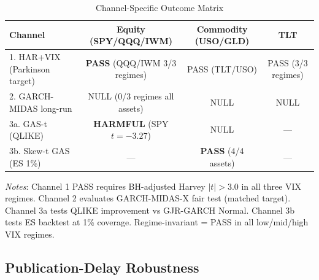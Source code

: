 \documentclass[12pt,a4paper]{article}
\begin{document}
\begin{table}[H]
\centering
\small
\begin{threeparttable}
\caption{Channel-Specific Outcome Matrix}
\label{tab:channel_outcomes}
\begin{tabular}{@{}lccc@{}}
\toprule
Channel & Equity (SPY/QQQ/IWM) & Commodity (USO/GLD) & TLT \\
\midrule
1. HAR+VIX (Parkinson target) & \textbf{PASS} (QQQ/IWM 3/3 regimes) & PASS (TLT/USO) & PASS (3/3 regimes) \\
2. GARCH-MIDAS long-run & NULL (0/3 regimes all assets) & NULL & NULL \\
3a. GAS-t (QLIKE) & \textbf{HARMFUL} (SPY $t=-3.27$) & NULL & --- \\
3b. Skew-t GAS (ES 1\%) & --- & \textbf{PASS} (4/4 assets) & --- \\
\bottomrule
\end{tabular}
\begin{tablenotes}
\small
\item \textit{Notes}: Channel 1 PASS requires BH-adjusted Harvey $|t|>3.0$ in all three VIX regimes. Channel 2 evaluates GARCH-MIDAS-X fair test (matched target). Channel 3a tests QLIKE improvement vs GJR-GARCH Normal. Channel 3b tests ES backtest at 1\% coverage. Regime-invariant = PASS in all low/mid/high VIX regimes.
\end{tablenotes}
\end{threeparttable}
\end{table}


\subsection{Publication-Delay Robustness}
\label{subsec:pub_delay_robust}

\end{document}
